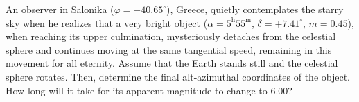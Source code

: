 An observer in Salonika ($\varphi = +40.65^\circ$), Greece, quietly
contemplates the starry sky when he realizes that a very bright object
($\alpha = 5^{\mathrm{h}}55^{\mathrm{m}}$, $\delta = +7.41^\circ$,
$m = 0.45$), when reaching its upper culmination, mysteriously detaches from
the celestial sphere and continues moving at the same tangential speed,
remaining in this movement for all eternity. Assume that the Earth stands
still and the celestial sphere rotates. Then, determine the final
alt-azimuthal coordinates of the object. How long will it take for its
apparent magnitude to change to 6.00?
